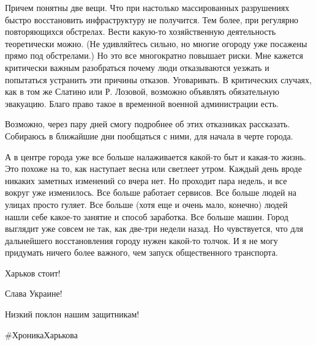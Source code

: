 Причем понятны две вещи. Что при настолько массированных разрушениях быстро
восстановить инфраструктуру не получится. Тем более, при регулярно
повторяющихся обстрелах. Вести какую-то хозяйственную деятельность теоретически
можно. (Не удивляйтесь сильно, но многие огороду уже посажены прямо под
обстрелами.) Но это все многократно повышает риски. Мне кажется критически
важным разобраться почему люди отказываются уезжать и попытаться устранить эти
причины отказов. Уговаривать. В критических случаях, как в том же Слатино или
Р. Лозовой, возможно объявлять обязательную эвакуацию. Благо право такое в
временной военной администрации есть.

Возможно, через пару дней смогу подробнее об этих отказниках рассказать.
Собираюсь в ближайшие дни пообщаться с ними, для начала в черте города.

А в центре города уже все больше налаживается какой-то быт и какая-то жизнь.
Это похоже на то, как наступает весна или светлеет утром. Каждый день вроде
никаких заметных изменений со вчера нет. Но проходит пара недель, и все вокруг
уже изменилось. Все больше работает сервисов. Все больше людей на улицах просто
гуляет. Все больше (хотя еще и очень мало, конечно) людей нашли себе какое-то
занятие и способ заработка. Все больше машин. Город выглядит уже совсем не так,
как две-три недели назад. Но чувствуется, что для дальнейшего восстановления
городу нужен какой-то толчок. И я не могу придумать ничего более важного, чем
запуск общественного транспорта.

Харьков стоит!

Слава Украине!

Низкий поклон нашим защитникам!

\#ХроникаХарькова

